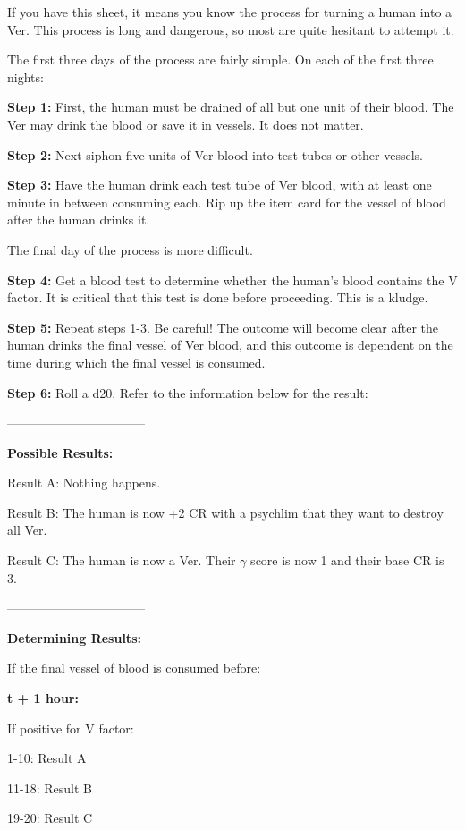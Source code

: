 \documentclass[green]{guildcamp4}
\begin{document}
\name{\gTurning{}}

If you have this sheet, it means you know the process for turning a human into a Ver. This process is long and dangerous, so most are quite hesitant to attempt it.

The first three days of the process are fairly simple. On each of the first three nights:

{\bf Step 1:} First, the human must be drained of all but one unit of their blood. The Ver may drink the blood or save it in vessels. It does not matter. 

{\bf Step 2:} Next siphon five units of Ver blood into test tubes or other vessels.

{\bf Step 3:} Have the human drink each test tube of Ver blood, with at least one minute in between consuming each. Rip up the item card for the vessel of blood after the human drinks it.

The final day of the process is more difficult.

{\bf Step 4:} Get a blood test to determine whether the human's blood contains the V factor. It is critical that this test is done before proceeding. This is a kludge.

{\bf Step 5:} Repeat steps 1-3. Be careful! The outcome will become clear after the human drinks the final vessel of Ver blood, and this outcome is dependent on the time during which the final vessel is consumed.

{\bf Step 6:} Roll a d20. Refer to the information below for the result:

---------------------------------

{\bf Possible Results:}

Result A: Nothing happens.

Result B: The human is now +2 CR with a psychlim that they want to destroy all Ver.

Result C: The human is now a Ver. Their $\gamma$ score is now 1 and their base CR is 3.

---------------------------------

{\bf Determining Results:}

If the final vessel of blood is consumed before:

{\bf t + 1 hour:}

If positive for V factor:

1-10: Result A

11-18: Result B

19-20: Result C
\end{document}
